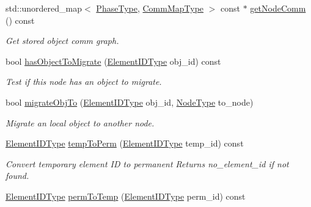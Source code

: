 \begin{DoxyCompactItemize}
std\+::unordered\+\_\+map$<$ \hyperlink{namespacevt_a46ce6733d5cdbd735d561b7b4029f6d7}{Phase\+Type}, \hyperlink{namespacevt_1_1vrt_1_1collection_1_1balance_a10860c956804d644db54a16012352728}{Comm\+Map\+Type} $>$ const  $\ast$ \hyperlink{structvt_1_1vrt_1_1collection_1_1balance_1_1_node_stats_a236c9f6b9ba7446a35cbc1052949d558}{get\+Node\+Comm} () const
\begin{DoxyCompactList}\small\item\em Get stored object comm graph. \end{DoxyCompactList}\item 
bool \hyperlink{structvt_1_1vrt_1_1collection_1_1balance_1_1_node_stats_a06128ad9d9dff72bad160b015054b054}{has\+Object\+To\+Migrate} (\hyperlink{namespacevt_1_1vrt_1_1collection_1_1balance_a14c8d2c972f2913aa3f1636e5be0a120}{Element\+I\+D\+Type} obj\+\_\+id) const
\begin{DoxyCompactList}\small\item\em Test if this node has an object to migrate. \end{DoxyCompactList}\item 
bool \hyperlink{structvt_1_1vrt_1_1collection_1_1balance_1_1_node_stats_a4beddbda7ae149a3470eba3a2fe80db5}{migrate\+Obj\+To} (\hyperlink{namespacevt_1_1vrt_1_1collection_1_1balance_a14c8d2c972f2913aa3f1636e5be0a120}{Element\+I\+D\+Type} obj\+\_\+id, \hyperlink{namespacevt_a866da9d0efc19c0a1ce79e9e492f47e2}{Node\+Type} to\+\_\+node)
\begin{DoxyCompactList}\small\item\em Migrate an local object to another node. \end{DoxyCompactList}\item 
\hyperlink{namespacevt_1_1vrt_1_1collection_1_1balance_a14c8d2c972f2913aa3f1636e5be0a120}{Element\+I\+D\+Type} \hyperlink{structvt_1_1vrt_1_1collection_1_1balance_1_1_node_stats_a259d49b9aa4759b9d94be3e093fa2e6b}{temp\+To\+Perm} (\hyperlink{namespacevt_1_1vrt_1_1collection_1_1balance_a14c8d2c972f2913aa3f1636e5be0a120}{Element\+I\+D\+Type} temp\+\_\+id) const
\begin{DoxyCompactList}\small\item\em Convert temporary element ID to permanent Returns {\ttfamily no\+\_\+element\+\_\+id} if not found. \end{DoxyCompactList}\item 
\hyperlink{namespacevt_1_1vrt_1_1collection_1_1balance_a14c8d2c972f2913aa3f1636e5be0a120}{Element\+I\+D\+Type} \hyperlink{structvt_1_1vrt_1_1collection_1_1balance_1_1_node_stats_a6e13d373b5365771b1f08fc0bd5c0bda}{perm\+To\+Temp} (\hyperlink{namespacevt_1_1vrt_1_1collection_1_1balance_a14c8d2c972f2913aa3f1636e5be0a120}{Element\+I\+D\+Type} perm\+\_\+id) const

\end{DoxyCompactItemize}
